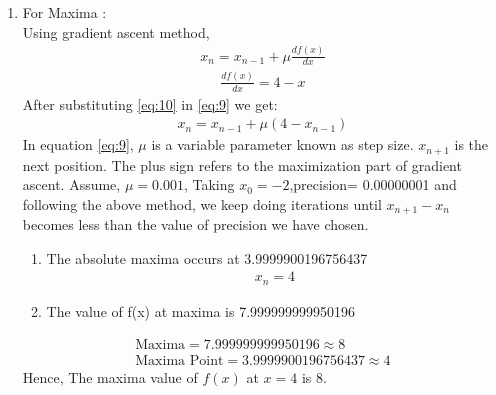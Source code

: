 \documentclass[10pt, a4paper]{article}
\begin{document}
\begin{enumerate}
\item For Maxima : \\
    Using gradient ascent method,
\begin{align}
    x_n=x_{n-1}+\mu\frac{df(x)}{dx} \label{eq:9}
    \end{align}
    \begin{align}
    \frac{df(x)}{dx}=4-x \label{eq:10}
\end{align}
After substituting \ref{eq:10} in \ref{eq:9} we get:
\begin{align}
    x_n=x_{n-1}+\mu(4-x_{n-1})\label{eq:11}
\end{align}
In equation \eqref{eq:9}, $\mu$ is a variable parameter known as step size. $x_{n+1}$ is the next position. The plus sign refers to the maximization part of gradient ascent. Assume, $\mu=0.001$, Taking $x_0=-2$,precision= 0.00000001 and following the above method, we keep doing iterations until $x_{n+1}-x_{n}$ becomes less than the value of precision we have chosen.
\begin{enumerate}
	\item The absolute maxima occurs at
	3.9999900196756437
	\begin{align}
    x_n=4
\end{align}
	\item The value of f(x) at maxima is 
	7.999999999950196
\end{enumerate}
    \begin{align}
        \boxed{\text{Maxima} = 7.999999999950196 \approx 8 }\\
        \boxed{\text{Maxima Point} = 3.9999900196756437 \approx 4}
    \end{align}
    Hence, The maxima value of $f(x)$ at $x=4$ is 8.
    

\end{enumerate}
\end{document}
